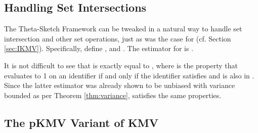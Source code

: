 \documentclass{article}
\newcommand{\eat}[1]{}
\begin{document}
\subsection{Handling Set Intersections}\label{sec:intersections}
The Theta-Sketch Framework can be tweaked in a natural way to handle set intersection and other set operations, just as was the case
for  (cf. Section \ref{sec:IKMV}).
Specifically, define , and .
The estimator for  is . 

It is not difficult to see that  is exactly equal to , where  is the property that evaluates to 1 on an identifier if and only if
the identifier satisfies  and is also in . Since the latter estimator was already shown to be unbiased with variance bounded as per Theorem \ref{thm:variance},
 satisfies the same properties. 


\eat{\subsection{Practical Notes}\label{sec:practical-notes}

It might appear from Algorithm~\ref{code:framework} that the Theta-Sketch Framework makes two passes over the 
input stream: one to compute , and another one to compute .  Actual instantiations of the framework (such as when
the base algorithms are KMV, Adaptive Sampling, pKMV, or the Alpha Algorithm) can
perform both operations in a single pass. 

Also, it is highly advantageous for real systems to be able to compute and save the results of 
sub-expressions of larger set expressions as soon as the necessary data becomes available. Because 
theta-sketches remember the sampling level via , it is possible to simply drop
samples from  that don't satisfy a set expression.\footnote{By contrast, the AKMV system
of \cite{beyer2009distinct} must keep those ``non-satisfying samples'' as placeholders, so it marks them using a
extra vector of  bits that is included in each sketch.} An implementation of the
Theta-Sketch Framework can enable this ``sketches from set expressions''
feature by providing the following function SetOp2(). 
Arbitrary set expressions can then be handled in the obvious way using evaluation trees.

\begin{algorithmic}[1]{\small
\STATE Function SetOp2 (, , {\bf op}  )
\STATE .
\STATE .
\RETURN .}
\end{algorithmic}
}
\subsection{The pKMV Variant of KMV}
\label{sec:pkmv}
\end{document}

